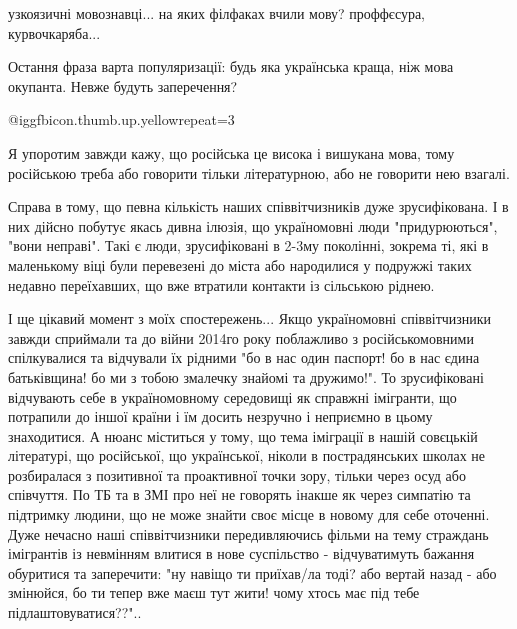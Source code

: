 \begin{itemize}
узкоязичні мовознавці... на яких філфаках вчили мову? проффєсура, курвочкаряба...

 
Остання фраза варта популяризації: будь яка українська краща, ніж мова окупанта. Невже будуть заперечення?

 
@igg{fbicon.thumb.up.yellow}{repeat=3}

 

Я упоротим завжди кажу, що російська це висока і вишукана мова, тому російською
треба або говорити тільки літературною, або не говорити нею взагалі.

 

Справа в тому, що певна кількість наших співвітчизників дуже зрусифікована. І в
них дійсно побутує якась дивна ілюзія, що україномовні люди "придурюються",
"вони неправі". Такі є люди, зрусифіковані в 2-3му поколінні, зокрема ті, які в
маленькому віці були перевезені до міста або народилися у подружжі таких
недавно переїхавших, що вже втратили контакти із сільською ріднею.

І ще цікавий момент з моїх спостережень... Якщо україномовні співвітчизники
завжди сприймали та до війни 2014го року поблажливо з російськомовними
спілкувалися та відчували їх рідними "бо в нас один паспорт! бо в нас єдина
батьківщина! бо ми з тобою змалечку знайомі та дружимо!". То зрусифіковані
відчувають себе в україномовному середовищі як справжні імігранти, що потрапили
до іншої країни і їм досить незручно і неприємно в цьому знаходитися. А нюанс
міститься у тому, що тема іміграції в нашій совєцькій літературі, що
російської, що української, ніколи в пострадянських школах не розбиралася з
позитивної та проактивної точки зору, тільки через осуд або співчуття. По ТБ та
в ЗМІ про неї не говорять інакше як через симпатію та підтримку людини, що не
може знайти своє місце в новому для себе оточенні. Дуже нечасно наші
співвітчизники передивляючись фільми на тему страждань імігрантів із невмінням
влитися в нове суспільство - відчуватимуть бажання обуритися та заперечити: "ну
навіщо ти приїхав/ла тоді? або вертай назад - або змінюйся, бо ти тепер вже
маєш тут жити! чому хтось має під тебе підлаштовуватися??"..


\end{itemize}
